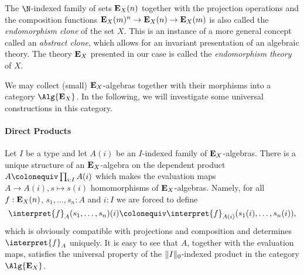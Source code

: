 {\begin{remark}
  The \(\N\)-indexed family of sets \(\EE_X(n)\) together with the projection operations and the composition functions \(\EE_X(m)^n \to \EE_X(n) \to \EE_X(m)\) is also called the \emph{endomorphism clone} of the set \(X\).
  This is an instance of a more general concept called an \emph{abstract clone}, which allows for an invariant presentation of an algebraic theory.
  The theory \(\EE_X\) presented in our case is called the \emph{endomorphism theory} of \(X\).
\end{remark}

We may collect (small) \(\EE_X\)-algebras together with their morphisms into a category \(\Alg{\EE_X}\).
In the following, we will investigate some universal constructions in this category.

\paragraph{Direct Products}

Let \(I\) be a type and let \(A(i)\) be an \(I\)-indexed family of \(\EE_X\)-algebras.
There is a unique structure of an \(\EE_X\)-algebra on the dependent product \(A\colonequiv \prod_{i:I}A(i)\) which makes the evaluation maps \(A \to A(i), s \mapsto s(i)\) homomorphisms of \(\EE_X\)-algebras.
Namely, for all \(f:\EE_X(n)\), \(s_1,\dots,s_n:A\) and \(i:I\) we are forced to define
\[
  \interpret{f}_A(s_1,\dots,s_n)(i) \colonequiv \interpret{f}_{A(i)}(s_1(i),\dots,s_n(i)),
\]
which is obviously compatible with projections and composition and determines \(\interpret{f}_A\) uniquely.
It is easy to see that \(A\), together with the evaluation maps, satisfies the universal property of the \(\Trunc[0]{I}\)-indexed product in the category \(\Alg{\EE_X}\).


}
